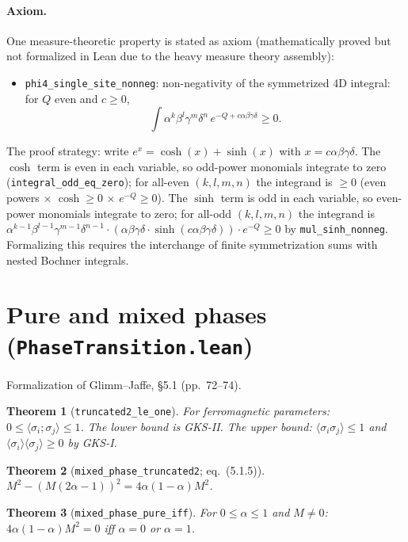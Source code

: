 \documentclass[a4paper,11pt]{article}
\newtheorem{theorem}{Theorem}
\begin{document}
\paragraph{Axiom.}
One measure-theoretic property is stated as axiom (mathematically
proved but not formalized in Lean due to the heavy measure theory assembly):
\begin{itemize}
\item \texttt{phi4\_single\_\allowbreak site\_nonneg}: non-negativity of the
  symmetrized 4D integral: for $Q$ even and $c \ge 0$,
  \[
    \int \alpha^k\beta^l\gamma^m\delta^n \,
    e^{-Q + c\alpha\beta\gamma\delta} \ge 0.
  \]
\end{itemize}
The proof strategy: write $e^x = \cosh(x) + \sinh(x)$ with $x = c\alpha\beta\gamma\delta$.
The $\cosh$ term is even in each variable, so odd-power monomials integrate to zero
(\texttt{integral\_odd\_eq\_zero}); for all-even $(k,l,m,n)$ the integrand is
$\ge 0$ (even powers $\times$ $\cosh \ge 0$ $\times$ $e^{-Q} \ge 0$).
The $\sinh$ term is odd in each variable, so even-power monomials integrate to zero;
for all-odd $(k,l,m,n)$ the integrand is
$\alpha^{k-1}\beta^{l-1}\gamma^{m-1}\delta^{n-1} \cdot
(\alpha\beta\gamma\delta \cdot \sinh(c\alpha\beta\gamma\delta)) \cdot e^{-Q} \ge 0$
by \texttt{mul\_sinh\_nonneg}.
Formalizing this requires the interchange of finite symmetrization sums with
nested Bochner integrals.

\section{Pure and mixed phases (\texttt{PhaseTransition.lean})}

Formalization of Glimm--Jaffe, \S5.1 (pp.~72--74).

\begin{theorem}[\texttt{truncated2\_le\_one}]
For ferromagnetic parameters: $0 \le \langle\sigma_i;\sigma_j\rangle \le 1$.
The lower bound is GKS-II. The upper bound: $\langle\sigma_i\sigma_j\rangle \le 1$
and $\langle\sigma_i\rangle\langle\sigma_j\rangle \ge 0$ by GKS-I.
\end{theorem}

\begin{theorem}[\texttt{mixed\_phase\_truncated2}; eq.~(5.1.5)]
$M^2 - (M(2\alpha - 1))^2 = 4\alpha(1-\alpha)M^2$.
\end{theorem}

\begin{theorem}[\texttt{mixed\_phase\_pure\_iff}]
For $0 \le \alpha \le 1$ and $M \ne 0$:
$4\alpha(1-\alpha)M^2 = 0$ iff $\alpha = 0$ or $\alpha = 1$.
\end{theorem}
\end{document}
